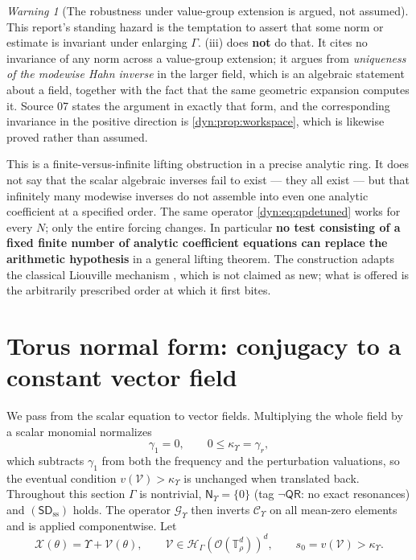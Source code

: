 \documentclass[11pt,letterpaper]{article}
\theoremstyle{definition}
\theoremstyle{remark}
\newtheorem{warning}[warning]{Warning}
\newcommand{\HH}{\mathscr H}
\newcommand{\OO}{\mathcal O}
\newcommand{\qres}{\mathsf{QR}}
\newcommand{\sdss}{\mathsf{SD}_{\mathrm{ss}}}
\newcommand{\TT}{\mathbb T}
\newcommand{\strip}{\OO(\TT^{d}_{\rho})}
\newcommand{\Cups}{\mathcal C_{\Upsilon}}
\newcommand{\Gups}{\mathcal G_{\Upsilon}}
\newcommand{\qlat}{\mathsf N_{\Upsilon}}
\newcommand{\kups}{\kappa_{\Upsilon}}
\numberwithin{equation}{section}
\begin{document}
\begin{warning}[The robustness under value-group extension is argued, not
assumed]\label{dyn:warn:qpextension}
This report's standing hazard is the temptation to assert that some norm or
estimate is invariant under enlarging $\Gamma$. (iii)
does \textbf{not} do that. It cites no invariance of any norm across a
value-group extension; it argues from \emph{uniqueness of the modewise Hahn
inverse} in the larger field, which is an algebraic statement about a
field, together with the fact that the same geometric expansion computes
it. Source 07 states the argument in exactly that form, and the
corresponding invariance in the positive direction is
\cref{dyn:prop:workspace}, which is likewise proved rather than assumed.
\end{warning}

This is a finite-versus-infinite lifting obstruction in a precise analytic
ring. It does not say that the scalar algebraic inverses fail to exist ---
they all exist --- but that infinitely many modewise inverses do not
assemble into even one analytic coefficient at a specified order. The same
operator \eqref{dyn:eq:qpdetuned} works for every $N$; only the entire
forcing changes. In particular \textbf{no test consisting of a fixed finite
number of analytic coefficient equations can replace the arithmetic
hypothesis} in a general lifting theorem. The construction adapts the
classical Liouville mechanism \cite{Kamienski}, which is not claimed as
new; what is offered is the arbitrarily prescribed order at which it first
bites.

\section{Torus normal form: conjugacy to a constant vector field}
\label{dyn:sec:qpnonlinear}

We pass from the scalar equation to vector fields. Multiplying the whole
field by a scalar monomial normalizes
\begin{equation}\label{dyn:eq:qpnormalized}
 \gamma_1=0,\qquad 0\le\kups=\gamma_r ,
\end{equation}
which subtracts $\gamma_1$ from both the frequency and the perturbation
valuations, so the eventual condition $v(\mathcal V)>\kups$ is unchanged
when translated back. Throughout this section $\Gamma$ is nontrivial,
$\qlat=\{0\}$ (tag $\lnot\qres$: no exact resonances) and
$(\sdss)$ holds. The operator $\Gups$ then inverts $\Cups$ on all mean-zero
elements and is applied componentwise. Let
\begin{equation}\label{dyn:eq:qpvectorfield}
 \mathcal X(\theta)=\Upsilon+\mathcal V(\theta),\qquad
 \mathcal V\in\HH_\Gamma(\strip)^{d},\qquad
 s_0=v(\mathcal V)>\kups .
\end{equation}
\end{document}
